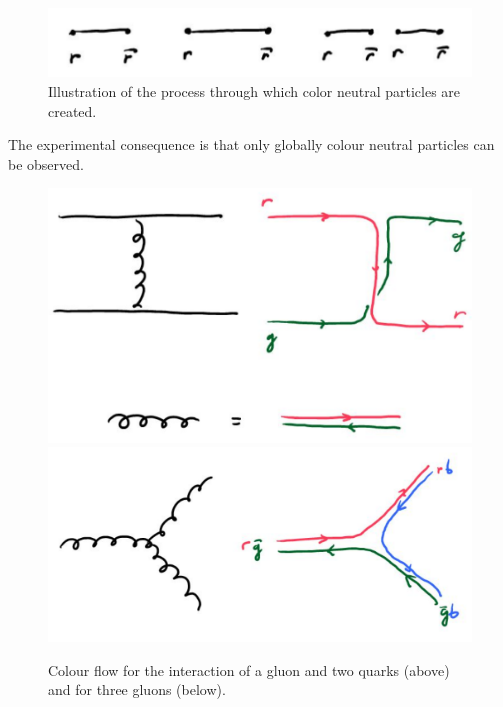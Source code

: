 \documentclass[12pt]{article}
\begin{document}
\begin{figure}
\begin{center}
\includegraphics[scale=0.45]{images/hadronisation.png}
\end{center}
\caption{Illustration of the process through which color neutral particles are created.}\label{fig:hardonisation}\end{figure}
 The experimental consequence is that only globally colour neutral particles can be observed.      
\begin{figure}
\begin{center}
\includegraphics[scale=0.35]{images/ColorExchange.png}
\includegraphics[scale=0.25]{images/GluonColor.png}
\end{center}
\caption{Colour flow for the interaction of a gluon and two quarks (above) and for three gluons (below).}\label{fig:colour}
\end{figure}
\end{document}
